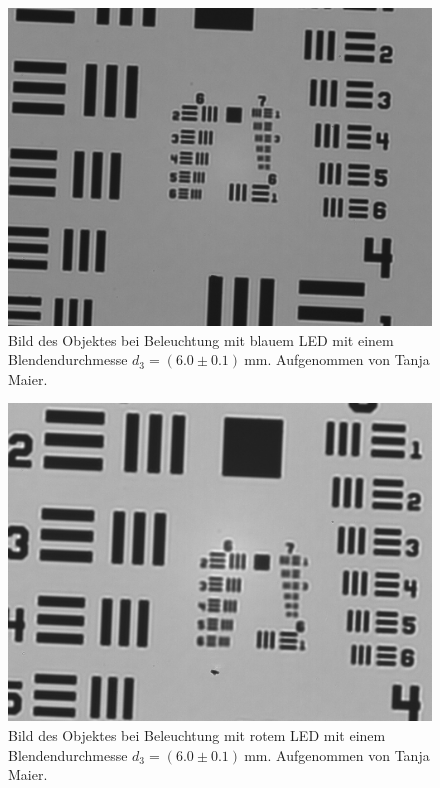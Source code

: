 \documentclass{article}
\begin{document}
\begin{minipage}[t]{.45\textwidth}
\begin{figure}[H]
\includegraphics[scale=0.1]{tm/Bild_blau_grosse Lochblende.jpg}
\caption{Bild des Objektes bei Beleuchtung mit blauem LED mit einem Blendendurchmesse $d_3=(6.0\pm0.1)~$mm. Aufgenommen von Tanja Maier.}
\label{fig:bbild_klein_blau_tm}
\end{figure}
\end{minipage}
\hfill
\noindent
\begin{minipage}[t]{.45\textwidth}
\begin{figure}[H]
\includegraphics[scale=0.1]{tm/Bild_rot_grosse Lochblende.jpg}
\caption{Bild des Objektes bei Beleuchtung mit rotem LED mit einem Blendendurchmesse $d_3=(6.0\pm0.1)~$mm. Aufgenommen von Tanja Maier.}
\end{figure}
\end{minipage}
\end{document}
